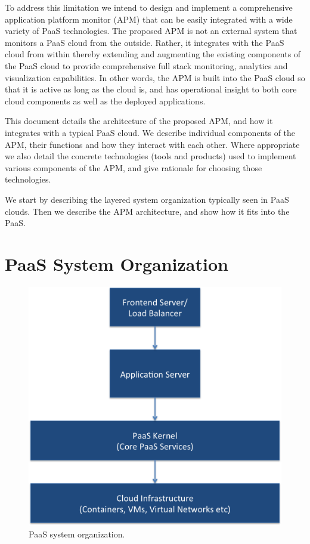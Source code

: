 \documentclass[11pt]{article}
\begin{document}
To address this limitation we intend to design and implement a comprehensive application platform 
monitor (APM) that can be easily integrated with a wide variety of PaaS technologies. The proposed
APM is not an external system that monitors a PaaS cloud from the outside. Rather, it integrates with
the PaaS cloud from within thereby extending and augmenting the existing components of the PaaS cloud
to provide comprehensive full stack monitoring, analytics and visualization capabilities. In other words,
the APM is built into the PaaS cloud so that it is active as long as the cloud is, and has operational
insight to both core cloud components as well as the deployed applications.

This document details the architecture of the proposed APM, and how it integrates with a typical PaaS
cloud. We describe individual components of the APM, their functions and how they interact with each
other. Where appropriate we also detail the concrete technologies (tools and products) used to implement
various components of the APM, and give rationale for choosing those technologies.

We start by describing the layered system organization typically seen in PaaS clouds. Then we describe
the APM architecture, and show how it fits into the PaaS.

\section{PaaS System Organization}
\begin{figure}
\centering
\includegraphics[scale=0.5]{paas_architecture}
\caption{PaaS system organization.}
\label{fig:paas_architecture}
\end{figure}
\end{document}
